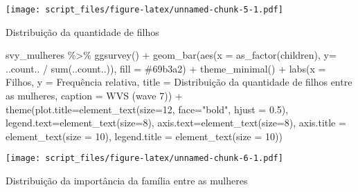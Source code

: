 \documentclass[
]{article}
\newenvironment{Shaded}{\begin{snugshade}}{\end{snugshade}}
\newcommand{\AttributeTok}[1]{\textcolor[rgb]{0.77,0.63,0.00}{#1}}
\newcommand{\DecValTok}[1]{\textcolor[rgb]{0.00,0.00,0.81}{#1}}
\newcommand{\FloatTok}[1]{\textcolor[rgb]{0.00,0.00,0.81}{#1}}
\newcommand{\FunctionTok}[1]{\textcolor[rgb]{0.00,0.00,0.00}{#1}}
\newcommand{\NormalTok}[1]{#1}
\newcommand{\SpecialCharTok}[1]{\textcolor[rgb]{0.00,0.00,0.00}{#1}}
\newcommand{\StringTok}[1]{\textcolor[rgb]{0.31,0.60,0.02}{#1}}
\begin{document}
\texttt{[image: script\_files/figure-latex/unnamed-chunk-5-1.pdf]}

Distribuição da quantidade de filhos

\begin{Shaded}
\begin{Highlighting}[]
\NormalTok{svy\_mulheres }\SpecialCharTok{\%\textgreater{}\%} 
  \FunctionTok{ggsurvey}\NormalTok{() }\SpecialCharTok{+}
  \FunctionTok{geom\_bar}\NormalTok{(}\FunctionTok{aes}\NormalTok{(}\AttributeTok{x =} \FunctionTok{as\_factor}\NormalTok{(children), }\AttributeTok{y=}\NormalTok{ ..count.. }\SpecialCharTok{/} \FunctionTok{sum}\NormalTok{(..count..)), }\AttributeTok{fill =} \StringTok{\textquotesingle{}\#69b3a2\textquotesingle{}}\NormalTok{) }\SpecialCharTok{+}
  \FunctionTok{theme\_minimal}\NormalTok{() }\SpecialCharTok{+}
  \FunctionTok{labs}\NormalTok{(}\AttributeTok{x =} \StringTok{\textquotesingle{}Filhos\textquotesingle{}}\NormalTok{,}
       \AttributeTok{y =} \StringTok{\textquotesingle{}Frequência relativa\textquotesingle{}}\NormalTok{,}
       \AttributeTok{title =} \StringTok{\textquotesingle{}Distribuição da quantidade de filhos entre as mulheres\textquotesingle{}}\NormalTok{,}
       \AttributeTok{caption =} \StringTok{\textquotesingle{}WVS (wave 7)\textquotesingle{}}\NormalTok{) }\SpecialCharTok{+}
  \FunctionTok{theme}\NormalTok{(}\AttributeTok{plot.title=}\FunctionTok{element\_text}\NormalTok{(}\AttributeTok{size=}\DecValTok{12}\NormalTok{, }\AttributeTok{face=}\StringTok{"bold"}\NormalTok{, }\AttributeTok{hjust =} \FloatTok{0.5}\NormalTok{),}
        \AttributeTok{legend.text=}\FunctionTok{element\_text}\NormalTok{(}\AttributeTok{size=}\DecValTok{8}\NormalTok{),}
        \AttributeTok{axis.text=}\FunctionTok{element\_text}\NormalTok{(}\AttributeTok{size=}\DecValTok{8}\NormalTok{),}
        \AttributeTok{axis.title =} \FunctionTok{element\_text}\NormalTok{(}\AttributeTok{size =} \DecValTok{10}\NormalTok{),}
        \AttributeTok{legend.title =} \FunctionTok{element\_text}\NormalTok{(}\AttributeTok{size =} \DecValTok{10}\NormalTok{))}
\end{Highlighting}
\end{Shaded}

\texttt{[image: script\_files/figure-latex/unnamed-chunk-6-1.pdf]}

Distribuição da importância da família entre as mulheres
\end{document}
